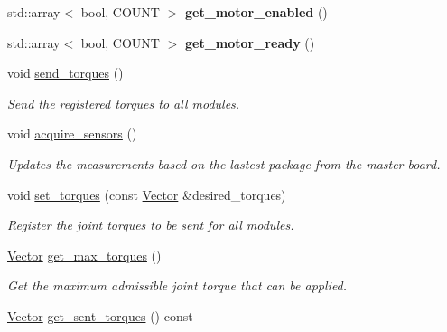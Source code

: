 \begin{DoxyCompactItemize}
std\+::array$<$ bool, C\+O\+U\+NT $>$ {\bfseries get\+\_\+motor\+\_\+enabled} ()
\item 
\mbox{\label{classblmc__robots_1_1SpiJointModules_a71100d256d263b29636fdc44e640c624}} 
std\+::array$<$ bool, C\+O\+U\+NT $>$ {\bfseries get\+\_\+motor\+\_\+ready} ()
\item 
\mbox{\label{classblmc__robots_1_1SpiJointModules_a13bab38386fcc431b89dd24e794fe90f}} 
void \hyperlink{classblmc__robots_1_1SpiJointModules_a13bab38386fcc431b89dd24e794fe90f}{send\+\_\+torques} ()
\begin{DoxyCompactList}\small\item\em Send the registered torques to all modules. \end{DoxyCompactList}\item 
\mbox{\label{classblmc__robots_1_1SpiJointModules_ace3da158cead5e39198f8f7e9f24a04a}} 
void \hyperlink{classblmc__robots_1_1SpiJointModules_ace3da158cead5e39198f8f7e9f24a04a}{acquire\+\_\+sensors} ()
\begin{DoxyCompactList}\small\item\em Updates the measurements based on the lastest package from the master board. \end{DoxyCompactList}\item 
void \hyperlink{classblmc__robots_1_1SpiJointModules_ad4abbcc6c228d823c06827093606983a}{set\+\_\+torques} (const \hyperlink{classblmc__robots_1_1SpiJointModules_a2d48f81ec41a42a240e80cd22d4fa2f8}{Vector} \&desired\+\_\+torques)
\begin{DoxyCompactList}\small\item\em Register the joint torques to be sent for all modules. \end{DoxyCompactList}\item 
\hyperlink{classblmc__robots_1_1SpiJointModules_a2d48f81ec41a42a240e80cd22d4fa2f8}{Vector} \hyperlink{classblmc__robots_1_1SpiJointModules_a84c6efc9eddde57a1409c724193f3c50}{get\+\_\+max\+\_\+torques} ()
\begin{DoxyCompactList}\small\item\em Get the maximum admissible joint torque that can be applied. \end{DoxyCompactList}\item 
\hyperlink{classblmc__robots_1_1SpiJointModules_a2d48f81ec41a42a240e80cd22d4fa2f8}{Vector} \hyperlink{classblmc__robots_1_1SpiJointModules_a832ad3d4c2817bd20f50109d628d70b0}{get\+\_\+sent\+\_\+torques} () const

\end{DoxyCompactItemize}
